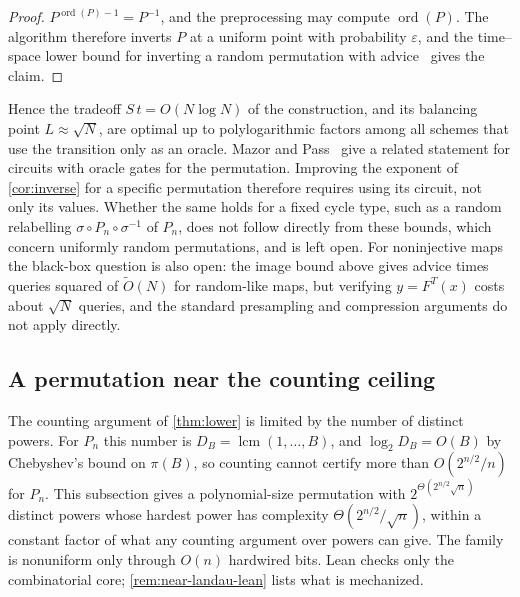 \documentclass[11pt]{article}
\theoremstyle{definition}
\theoremstyle{remark}
\newcommand{\lcm}{\operatorname{lcm}}
\newcommand{\ord}{\operatorname{ord}}
\numberwithin{equation}{section}
\begin{document}
\begin{proof}
$P^{\ord(P)-1}=P^{-1}$, and the preprocessing may compute $\ord(P)$.
The algorithm therefore inverts $P$ at a uniform point with probability
$\varepsilon$, and the time--space lower bound for inverting a random
permutation with advice~\cite{Yao90,DTT10} gives the claim.
\end{proof}

Hence the tradeoff $S\,t=O(N\log N)$ of the construction, and its
balancing point $L\approx\sqrt N$, are optimal up to polylogarithmic
factors among all schemes that use the transition only as an oracle.
Mazor and Pass~\cite[Theorem~5.8]{MP24} give a related statement for
circuits with oracle gates for the permutation.  Improving the
exponent of \cref{cor:inverse} for a specific permutation therefore
requires using its circuit, not only its values.  Whether the same
holds for a fixed cycle type, such as a random relabelling
$\sigma\circ P_n\circ\sigma^{-1}$ of $P_n$, does not follow directly from
these bounds, which concern uniformly random permutations, and is left
open.  For noninjective maps the black-box question is also open: the
image bound above gives advice times queries squared of
$\widetilde O(N)$ for random-like maps, but verifying $y=F^T(x)$ costs
about $\sqrt N$ queries, and the standard presampling and compression
arguments do not apply directly.

\subsection{A permutation near the counting ceiling}\label{sec:near-landau}

The counting argument of \cref{thm:lower} is limited by the number of
distinct powers.  For $P_n$ this number is $D_B=\lcm(1,\ldots,B)$, and
$\log_2D_B=O(B)$ by Chebyshev's bound on $\pi(B)$, so counting cannot
certify more than $O(2^{n/2}/n)$ for $P_n$.  This subsection gives a
polynomial-size permutation with $2^{\Theta(2^{n/2}\sqrt n)}$ distinct
powers whose hardest power has complexity $\Theta(2^{n/2}/\sqrt n)$,
within a constant factor of what any counting argument over powers can
give.  The family is nonuniform only through $O(n)$ hardwired bits.
Lean checks only the combinatorial core; \cref{rem:near-landau-lean}
lists what is mechanized.
\end{document}
